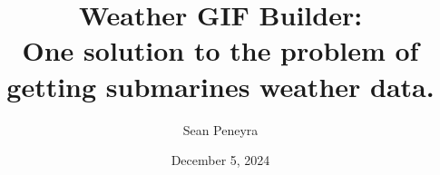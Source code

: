 \documentclass[letterpaper,notitlepage]{article}
\begin{document}
\title{Weather GIF Builder: \\ \Large{One solution to the problem of getting submarines weather data.}}

\author{Sean Peneyra}

\date{December 5, 2024}

\maketitle
\newcommand{\ket}[2]{|#1\:#2\rangle}
\newcommand{\bra}[2]{\langle #1\:#2|}
\newcommand{\braket}[4]{\langle #1\:#2|#3\:#4\rangle}
\newcommand{\Shat}[1]{\hat{S}_{#1}}
\newcommand{\twovec}[2]{\left(\!\!\!\!\begin{array}{c}#1\\#2\end{array}\!\!\!\!\right)}
\newcommand{\twoform}[2]{\left[\begin{array}{cc}#1&#2\end{array}\right]}
\newcommand{\threevec}[3]{\left[\begin{array}{c}#1\\#2\\#3\end{array}\right]}
\newcommand{\threeform}[3]{\left[\begin{array}{ccc}#1&#2&#3\end{array}\right]}
\newcommand{\twomatrix}[4]{\left(\!\!\!\!\begin{array}{cc}#1&#2\\#3&#4\end{array}\!\!\!\!\right)}
\newcommand{\oc}[0]{\twomatrix{1}{0}{0}{1}}
\newcommand{\ic}[0]{\twomatrix{i}{0}{0}{-i}}
\newcommand{\jc}[0]{\twomatrix{0}{1}{-1}{0}}
\newcommand{\kc}[0]{\twomatrix{0}{i}{i}{0}}
\newcommand{\ob}[0]{\mathbf{1}}
\newcommand{\ib}[0]{\mathbf{i}}
\newcommand{\jb}[0]{\mathbf{j}}
\newcommand{\kb}[0]{\mathbf{k}}
\newcommand{\threematrix}[9]{\left[\begin{array}{ccc}#1&#2&#3\\#4&#5&#6\\#7&#8&#9\end{array}\right]}
\newcommand{\ma}[1]{\measuredangle #1}
\newcommand{\Amatri}[0]{\threematrix{e^t}{2e^{-t}}{e^{2t}}{-e^t}{2e^{-t}}{e^{2t}}{3e^t}{-e^{-t}}{-e^{2t}}}
\newcommand{\Bmatri}[0]{\threematrix{2e^t}{e^{-t}}{3e^{2t}}{2e^t}{e^{-t}}{-e^{2t}}{-e^t}{3e^{-t}}{2e^{2t}}}
\newcommand{\del}[0]{\partial}
\newcommand{\delx}[1]{\frac{\partial #1}{\partial x}}
\newcommand{\dely}[1]{\frac{\partial #1}{\partial y}}
\newcommand{\bey}[0]{\begin{equation}}
\newcommand{\eey}[0]{\end{equation}}
\newcommand{\ben}[0]{\begin{equation*}}
\newcommand{\een}[0]{\end{equation*}}
\newcommand{\bay}[0]{\begin{align}}
\newcommand{\eay}[0]{\end{align}}
\newcommand{\ban}[0]{\begin{align*}}
\newcommand{\ean}[0]{\end{align*}}
\end{document}
